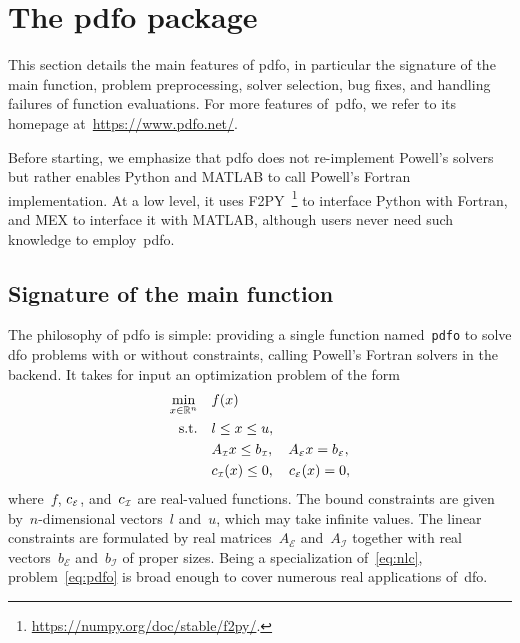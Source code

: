 \documentclass[
    smallextended,  %
    final,          %
]{svjour3}
\newcommand{\R}{\mathbb{R}}
\newcommand{\aeq}{A_{\scriptscriptstyle\mathcal{E}}}
\newcommand{\aub}{A_{\scriptscriptstyle\mathcal{I}}}
\newcommand{\beq}{b_{\scriptscriptstyle\mathcal{E}}}
\newcommand{\bub}{b_{\scriptscriptstyle\mathcal{I}}}
\newcommand{\ceq}{\con[\scriptscriptstyle\mathcal{E}]}
\newcommand{\con}[1][i]{c\ifthenelse{\equal{#1}{}}{}{_{#1}}}
\newcommand{\cub}{\con[\scriptscriptstyle\mathcal{I}]}
\newcommand{\obj}{f}
\newcommand{\st}{\text{s.t.}}
\newcommand{\xl}{l}
\newcommand{\xu}{u}
\newcommand{\pdfofun}{\texttt{pdfo}\xspace}
\begin{document}
\section{The \gls{pdfo} package}
\label{sec:pdfo}

This section details the main features of \gls{pdfo}, in particular the signature of the main
function, problem preprocessing, solver selection, bug fixes, and handling failures of function
evaluations. For more features of~\gls{pdfo}, we refer to its homepage
at~\url{https://www.pdfo.net/}.

Before starting, we
emphasize that \gls{pdfo} does not re-implement Powell’s solvers but rather enables Python and MATLAB
to call Powell's Fortran implementation.
At a low level, it uses F2PY~\footnote{\url{https://numpy.org/doc/stable/f2py/}.} to interface Python with Fortran, and MEX to
interface it with MATLAB, although users never need such knowledge to employ~\gls{pdfo}.

\subsection{Signature of the main function}

The philosophy of \gls{pdfo} is simple: providing a single function named~\pdfofun to solve
\gls{dfo} problems with or without constraints, calling Powell's Fortran solvers in the backend.
It takes for input an optimization problem of the form
\begin{subequations}
    \label{eq:pdfo}
    \begin{align}
        \min_{x \in \R^n}   & \quad \obj(x)\\
        \st                 & \quad \xl \le x \le \xu, \label{eq:pdfo-b}\\
                            & \quad \aub x \le \bub, \quad \aeq x = \beq, \label{eq:pdfo-l}\\
                            & \quad \cub(x) \le 0, \quad \ceq(x) = 0, \label{eq:pdfo-nl}
    \end{align}
\end{subequations}
where~$\obj$, $\ceq$, and~$\cub$ are real-valued functions. The bound constraints are given
by~$n$-dimensional vectors~$\xl$ and~$\xu$, which may take infinite values. The linear constraints
are formulated by real matrices~$\aeq$ and~$\aub$ together with real vectors~$\beq$ and~$\bub$ of
proper sizes. Being a specialization of~\eqref{eq:nlc}, problem~\eqref{eq:pdfo} is broad enough to
cover numerous real applications of~\gls{dfo}.
\end{document}
